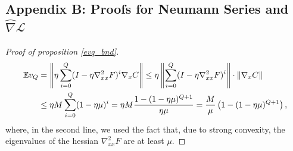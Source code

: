 \documentclass[11pt, twoside]{report}
\begin{document}
\subsection*{Appendix B: Proofs for Neumann Series and $\widehat{\nabla} \mathcal{L}$} \label{AppendixB}
\begin{proof}[Proof of proposition \ref{evq_bnd}]

\begin{align}
\mathbb{E}v_Q 
&= \left\| \eta \sum_{i=0}^Q (I - \eta \nabla_{xx}^2 F)^i \nabla_x C \right\| \leq \eta \left\| \sum_{i=0}^Q (I - \eta \nabla_{xx}^2 F)^i \right\| \cdot \|\nabla_x C\| \notag \\
&\leq \eta M \sum_{i=0}^Q (1 - \eta\mu)^i = \eta M \frac{1 - (1 - \eta\mu)^{Q+1}}{\eta\mu} \notag = \frac{M}{\mu} \left( 1 - (1 - \eta\mu)^{Q+1} \right),
\end{align}
where, in the second line, we used the fact that, due to strong convexity, the eigenvalues of the hessian $\nabla_{xx}^2 F$ are at least $\mu$.
\end{proof}
\end{document}
